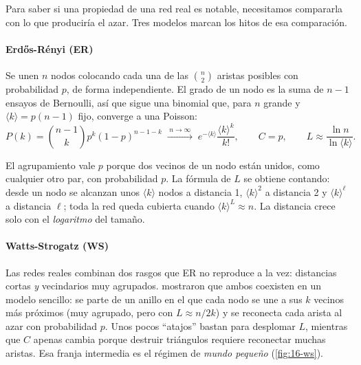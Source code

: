 Para saber si una propiedad de una red real es notable, necesitamos compararla con lo que produciría el azar. Tres modelos marcan los hitos de esa comparación.

\paragraph{Erdős-Rényi (ER)} Se unen $n$ nodos colocando cada una de las $\binom{n}{2}$ aristas posibles con probabilidad $p$, de forma independiente. El grado de un nodo es la suma de $n-1$ ensayos de Bernoulli, así que sigue una binomial que, para $n$ grande y $\langle k\rangle=p(n-1)$ fijo, converge a una Poisson:
\begin{equation}\label{eq:16-er}
P(k)=\binom{n-1}{k}p^k(1-p)^{n-1-k}\;\xrightarrow{\;n\to\infty\;}\;e^{-\langle k\rangle}\frac{\langle k\rangle^k}{k!},\qquad C=p,\qquad L\approx\frac{\ln n}{\ln\langle k\rangle}.
\end{equation}
\begin{simbolos}
\end{simbolos}
El agrupamiento vale $p$ porque dos vecinos de un nodo están unidos, como cualquier otro par, con probabilidad $p$. La fórmula de $L$ se obtiene contando: desde un nodo se alcanzan unos $\langle k\rangle$ nodos a distancia 1, $\langle k\rangle^2$ a distancia 2 y $\langle k\rangle^\ell$ a distancia $\ell$; toda la red queda cubierta cuando $\langle k\rangle^L\approx n$. La distancia crece solo con el \emph{logaritmo} del tamaño.

\paragraph{Watts-Strogatz (WS)} Las redes reales combinan dos rasgos que ER no reproduce a la vez: distancias cortas \emph{y} vecindarios muy agrupados. \textcite{c16-watts1998} mostraron que ambos coexisten en un modelo sencillo: se parte de un anillo en el que cada nodo se une a sus $k$ vecinos más próximos (muy agrupado, pero con $L\approx n/2k$) y se reconecta cada arista al azar con probabilidad $p$. Unos pocos ``atajos'' bastan para desplomar $L$, mientras que $C$ apenas cambia porque destruir triángulos requiere reconectar muchas aristas. Esa franja intermedia es el régimen de \emph{mundo pequeño} (\cref{fig:16-ws}).

